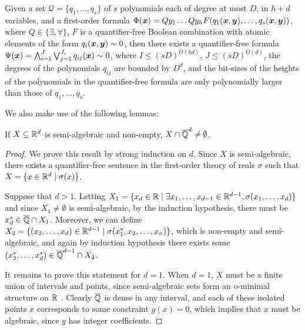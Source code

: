 \begin{theorem}
  \label{thm:quant-elim}
  Given a set $\mathcal{Q}=\lbrace q_1,\ldots,q_s\rbrace$ of $s$
  polynomials each of degree at most $D$, in $h+d$ variables, and a
  first-order formula $\Phi(\boldsymbol x)=Q y_1 \ldots Q y_h
  F(q_1(\boldsymbol x,\boldsymbol y),\ldots,q_s(\boldsymbol
  x,\boldsymbol y))$, where $Q\in\lbrace \exists,\forall\rbrace$, $F$
  is a quantifier-free Boolean combination with atomic elements of the
  form $q_i(\boldsymbol x,\boldsymbol y)\sim 0$, then there exists a
  quantifier-free formula $\Psi(\boldsymbol
  x)=\bigwedge_{i=1}^J\bigvee_{j=1}^{J_i}q_{ij}(\boldsymbol x)\sim 0$,
  where $I\leq (sD)^{O(hd)}$, $J\leq (sD)^{O(d)}$, the degrees of the
  polynomials $q_{ij}$ are bounded by $D^d$, and the bit-sizes of the
  heights of the polynomials in the quantifier-free formula are only
  polynomially larger than those of $q_1,\ldots,q_s$.
\end{theorem}

We also make use of the following lemmas:
\begin{lemma}
  If $X\subseteq\mathbb{R}^d$ is semi-algebraic and non-empty,
  $X\cap\overline{\mathbb{Q}}^d\neq\emptyset$.
\end{lemma}

\begin{proof}
  We prove this result by strong induction on $d$. Since $X$ is
  semi-algebraic, there exists a quantifier-free sentence in the
  first-order theory of reals $\sigma$ such that $X=\lbrace
  x\in\mathbb{R}^d\mid \sigma(x)\rbrace$.

  Suppose that $d>1$. Letting $X_1=\lbrace x_d\in\mathbb{R}\mid
  \exists
  x_1,\ldots,x_{d-1}\in\mathbb{R}^{d-1},\sigma(x_1,\ldots,x_d)\rbrace$
  and since $X_1\neq\emptyset$ is semi-algebraic, by the induction
  hypothesis, there must be $x_d^*\in\overline{\mathbb{Q}}\cap X_1$. Moreover, we
  can define $X_2=\lbrace (x_2,\ldots,x_d)\in\mathbb{R}^{d-1}\mid
  \sigma(x_1^*,x_2,\ldots,x_n)\rbrace$, which is non-empty and
  semi-algebraic, and again by induction hypothesis there exists some
  $(x_2^*,\ldots,x_d^*)\in\overline{\mathbb{Q}}^{d-1}\cap X_2$.

  It remains to prove this statement for $d=1$. When $d=1$, $X$ must
  be a finite union of intervals and points, since semi-algebraic sets
  form an o-minimal structure on $\mathbb{R}$ \cite{Tar51}. Clearly
  $\overline{\mathbb{Q}}$ is dense in any interval, and each of these isolated
  points $x$ corresponds to some constraint $g(x)=0$, which implies
  that $x$ must be algebraic, since $g$ has integer coefficients.
\end{proof}

